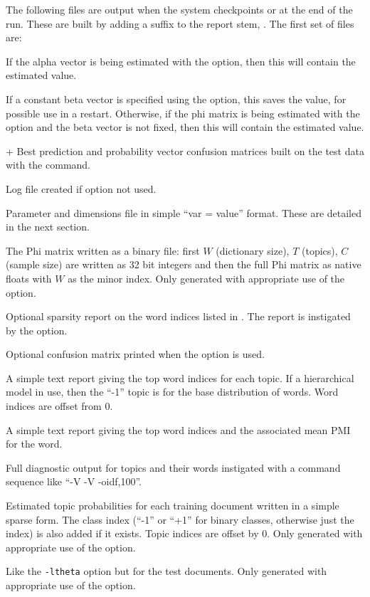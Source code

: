 \documentclass[a4paper,english]{article}
\begin{document}
The following files are output when the system checkpoints 
or at the end of the run.
These are built by adding a suffix to the report stem,
.
The first set of files are:
\begin{Description}\setlength{\itemsep}{0cm}
\item[\File{RepStem.alpha}] 
If the alpha vector is being estimated 
with the  option, then this will contain
the estimated value.
\item[\File{RepStem.beta}]  If a constant beta vector is specified
using the  option, this saves
   the value, for possible use in a restart.
Otherwise, if the phi matrix is being estimated 
with the  option
and the beta vector is not fixed, then this will contain
the estimated value.
\item[\File{RepStem.cnfs}+\File{RepStem.pcnfs}]  
Best prediction and probability vector confusion matrices
built on the test data with the 
 command.
\item[\File{RepStem.log}] Log file created if  option not used.
\item[\File{RepStem.par}] Parameter and dimensions file in simple ``var = value'' format.  These are detailed in the next section.
\item[\File{RepStem.phi}] The Phi matrix written as a binary file:
first $W$ (dictionary size), $T$ (topics), 
$C$ (sample size) are written as 32 bit integers and
then the full Phi matrix as native floats with $W$ as the minor index.
Only generated with appropriate use of the
 option.
\item[\File{RepStem.smap}] Optional sparsity report on the 
word indices listed in .
The report is instigated by the
 option.
\item[\File{RepStem.tbyc}]  Optional confusion matrix printed when
the  option is used.
\item[\File{RepStem.toplst}] A simple text report giving the top word indices
  for each topic.  If a hierarchical model in use, then the
``-1'' topic is for the base distribution of words.
Word indices are offset from 0.
\item[\File{RepStem.toppmi}] A simple text report giving the top word indices
and the associated mean PMI for the word.
\item[\File{RepStem.topset}] Full diagnostic output for topics and their words
instigated with a command sequence like ``-V -V -oidf,100''.
\item[\File{RepStem.theta}] Estimated topic probabilities 
for each training document
written in a simple sparse form.  The class index
(``-1'' or ``+1'' for binary classes, otherwise just the index)
is also added if it exists.
Topic indices are offset by 0.
Only generated with appropriate use of the
 option.
\item[\File{RepStem.testprob}] 
Like the \texttt{-ltheta} option but for the test documents.
Only generated with appropriate use of the
 option.
\end{Description}
\end{document}

